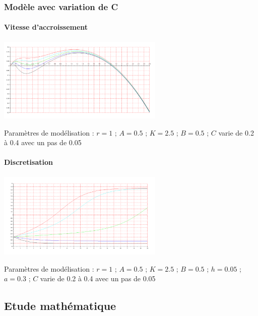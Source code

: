 \documentclass{article}
\begin{document}
\subsubsection{Modèle avec variation de C}

\paragraph{Vitesse d'accroissement}
\begin{center}
\includegraphics[width=300px]{img/part2/logC.png}
\end{center}
Paramètres de modélisation :  $r=1$ ; $A=0.5$ ; $K=2.5$ ; $B=0.5$ ; $C$ varie de 0.2 à 0.4 avec un pas de 0.05
\paragraph{}


\paragraph{Discretisation}
\begin{center}
\includegraphics[width=300px]{img/part2/TrajC.png}
\end{center}
Paramètres de modélisation :  $r=1$ ; $A=0.5$ ; $K=2.5$ ; $B=0.5$ ; $h=0.05$ ; $a=0.3$ ; $C$ varie de 0.2 à 0.4 avec un pas de 0.05
\paragraph{}

\subsection{Etude mathématique}
\end{document}
